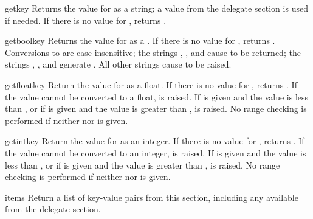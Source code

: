 \documentclass{howto}
\begin{document}
\begin{methoddesc}[Configuration]{get}{key}
  Returns the value for  as a string; a value from the
  delegate section is used if needed.  If there is no value for
  , returns .
\end{methoddesc}

\begin{methoddesc}[Configuration]{getbool}{key}
  Returns the value for  as a .  If there is no
  value for , returns .  Conversions to
   are case-insensitive; the strings ,
  , and  cause  to be returned; the
  strings , , and  generate
  .  All other strings cause  to be
  raised.
\end{methoddesc}

\begin{methoddesc}[Configuration]{getfloat}{key}
  Return the value for  as a float.  If there is no
  value for , returns .  If the value cannot
  be converted to a float,  is raised.  If
   is given and the value is less than , or if
   is given and the value is greater than ,
   is raised.  No range checking is performed if
  neither  nor  is given.
\end{methoddesc}

\begin{methoddesc}[Configuration]{getint}{key}
  Return the value for  as an integer.  If there is no
  value for , returns .  If the value cannot
  be converted to an integer,  is raised.  If
   is given and the value is less than , or if
   is given and the value is greater than ,
   is raised.  No range checking is performed if
  neither  nor  is given.
\end{methoddesc}

\begin{methoddesc}[Configuration]{items}{}
  Return a list of key-value pairs from this section, including any
  available from the delegate section.
\end{methoddesc}
\end{document}
